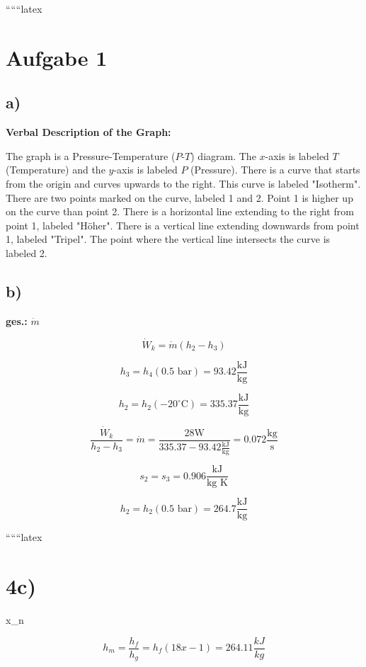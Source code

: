 
``````latex


\section*{Aufgabe 1}

\subsection*{a)}

\begin{center}
\textbf{Verbal Description of the Graph:}
\end{center}

The graph is a Pressure-Temperature ($P$-$T$) diagram. The $x$-axis is labeled $T$ (Temperature) and the $y$-axis is labeled $P$ (Pressure). There is a curve that starts from the origin and curves upwards to the right. This curve is labeled "Isotherm". There are two points marked on the curve, labeled 1 and 2. Point 1 is higher up on the curve than point 2. There is a horizontal line extending to the right from point 1, labeled "Höher". There is a vertical line extending downwards from point 1, labeled "Tripel". The point where the vertical line intersects the curve is labeled 2.

\subsection*{b)}

\textbf{ges.:} $\dot{m}$

\[
\dot{W}_k = \dot{m} (h_2 - h_3)
\]

\[
h_3 = h_4 (0.5 \text{ bar}) = 93.42 \frac{\text{kJ}}{\text{kg}}
\]

\[
h_2 = h_2 (-20^\circ \text{C}) = 335.37 \frac{\text{kJ}}{\text{kg}}
\]

\[
\frac{\dot{W}_k}{h_2 - h_3} = \dot{m} = \frac{28 \text{W}}{335.37 - 93.42 \frac{\text{kJ}}{\text{kg}}} = 0.072 \frac{\text{kg}}{\text{s}}
\]

\[
s_2 = s_3 = 0.906 \frac{\text{kJ}}{\text{kg K}}
\]

\[
h_2 = h_2 (0.5 \text{ bar}) = 264.7 \frac{\text{kJ}}{\text{kg}}
\]

``````latex


\section*{4c)}
 x_n

\[
h_{m} = \frac{h_{f}}{h_{g}} = h_{f}(18x-1) = 264.11 \frac{kJ}{kg}
\]

